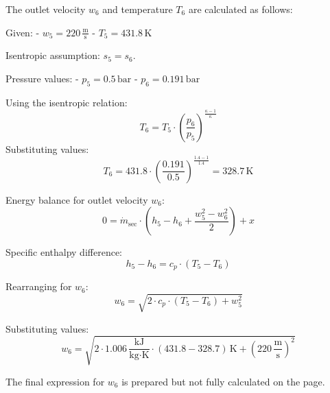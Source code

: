 The outlet velocity \( w_6 \) and temperature \( T_6 \) are calculated as follows:  

Given:  
- \( w_5 = 220 \, \frac{\text{m}}{\text{s}} \)  
- \( T_5 = 431.8 \, \text{K} \)  

Isentropic assumption: \( s_5 = s_6 \).  

Pressure values:  
- \( p_5 = 0.5 \, \text{bar} \)  
- \( p_6 = 0.191 \, \text{bar} \)  

Using the isentropic relation:  
\[
T_6 = T_5 \cdot \left( \frac{p_6}{p_5} \right)^{\frac{\kappa - 1}{\kappa}}
\]  
Substituting values:  
\[
T_6 = 431.8 \cdot \left( \frac{0.191}{0.5} \right)^{\frac{1.4 - 1}{1.4}} = 328.7 \, \text{K}
\]  

Energy balance for outlet velocity \( w_6 \):  
\[
0 = \dot{m}_{\text{sec}} \cdot \left( h_5 - h_6 + \frac{w_5^2 - w_6^2}{2} \right) + x
\]  

Specific enthalpy difference:  
\[
h_5 - h_6 = c_p \cdot (T_5 - T_6)
\]  

Rearranging for \( w_6 \):  
\[
w_6 = \sqrt{2 \cdot c_p \cdot (T_5 - T_6) + w_5^2}
\]  

Substituting values:  
\[
w_6 = \sqrt{2 \cdot 1.006 \, \frac{\text{kJ}}{\text{kg·K}} \cdot (431.8 - 328.7) \, \text{K} + (220 \, \frac{\text{m}}{\text{s}})^2}
\]  

The final expression for \( w_6 \) is prepared but not fully calculated on the page.